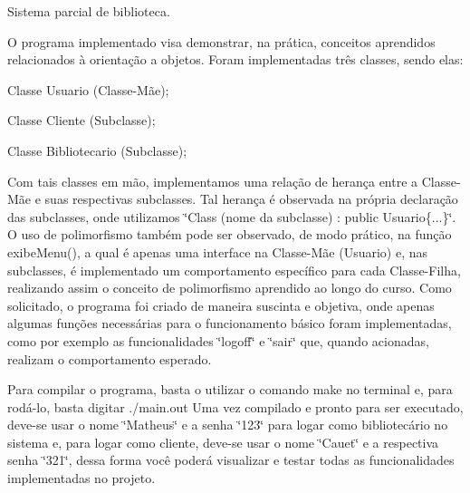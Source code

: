 Sistema parcial de biblioteca.

O programa implementado visa demonstrar, na prática, conceitos aprendidos relacionados à orientação a objetos. Foram implementadas três classes, sendo elas\+:
\begin{DoxyItemize}
\item Classe Usuario (Classe-\/\+Mãe);
\item Classe Cliente (Subclasse);
\item Classe Bibliotecario (Subclasse);
\end{DoxyItemize}

Com tais classes em mão, implementamos uma relação de herança entre a Classe-\/\+Mãe e suas respectivas subclasses. Tal herança é observada na própria declaração das subclasses, onde utilizamos \char`\"{}\+Class (nome da subclasse) \+: public Usuario\{...\}\char`\"{}. O uso de polimorfismo também pode ser observado, de modo prático, na função exibe\+Menu(), a qual é apenas uma interface na Classe-\/\+Mãe (Usuario) e, nas subclasses, é implementado um comportamento específico para cada Classe-\/\+Filha, realizando assim o conceito de polimorfismo aprendido ao longo do curso. Como solicitado, o programa foi criado de maneira suscinta e objetiva, onde apenas algumas funções necessárias para o funcionamento básico foram implementadas, como por exemplo as funcionalidades \char`\"{}logoff\char`\"{} e \char`\"{}sair\char`\"{} que, quando acionadas, realizam o comportamento esperado.

Para compilar o programa, basta o utilizar o comando make no terminal e, para rodá-\/lo, basta digitar ./main.out Uma vez compilado e pronto para ser executado, deve-\/se usar o nome \char`\"{}\+Matheus\char`\"{} e a senha \char`\"{}123\char`\"{} para logar como bibliotecário no sistema e, para logar como cliente, deve-\/se usar o nome \char`\"{}\+Cauet\char`\"{} e a respectiva senha \char`\"{}321\char`\"{}, dessa forma você poderá visualizar e testar todas as funcionalidades implementadas no projeto. 